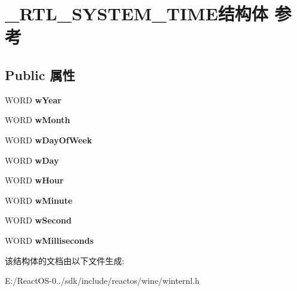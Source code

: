 \hypertarget{struct___r_t_l___s_y_s_t_e_m___t_i_m_e}{}\section{\+\_\+\+R\+T\+L\+\_\+\+S\+Y\+S\+T\+E\+M\+\_\+\+T\+I\+M\+E结构体 参考}
\label{struct___r_t_l___s_y_s_t_e_m___t_i_m_e}
\subsection*{Public 属性}
\begin{DoxyCompactItemize}
\item 
\mbox{\label{struct___r_t_l___s_y_s_t_e_m___t_i_m_e_ae08a48ff85ff5fea7b792f4677aeff7a}} 
W\+O\+RD {\bfseries w\+Year}
\item 
\mbox{\label{struct___r_t_l___s_y_s_t_e_m___t_i_m_e_a5ffe476c454b653fcf18899defc57175}} 
W\+O\+RD {\bfseries w\+Month}
\item 
\mbox{\label{struct___r_t_l___s_y_s_t_e_m___t_i_m_e_a2f8e70c2894d1dbba7d30637d827a37f}} 
W\+O\+RD {\bfseries w\+Day\+Of\+Week}
\item 
\mbox{\label{struct___r_t_l___s_y_s_t_e_m___t_i_m_e_ac0deebe06485f317aa85f1039cfd353b}} 
W\+O\+RD {\bfseries w\+Day}
\item 
\mbox{\label{struct___r_t_l___s_y_s_t_e_m___t_i_m_e_a9abb72f0d88bb5441f3e934a3132d30d}} 
W\+O\+RD {\bfseries w\+Hour}
\item 
\mbox{\label{struct___r_t_l___s_y_s_t_e_m___t_i_m_e_aeab68f90e56c3968c332e2cc4bf20bc2}} 
W\+O\+RD {\bfseries w\+Minute}
\item 
\mbox{\label{struct___r_t_l___s_y_s_t_e_m___t_i_m_e_a97988c5f2c71c9f4859d376614b8200b}} 
W\+O\+RD {\bfseries w\+Second}
\item 
\mbox{\label{struct___r_t_l___s_y_s_t_e_m___t_i_m_e_a5195b270e82bb267ffc38898fc0e67d9}} 
W\+O\+RD {\bfseries w\+Milliseconds}
\end{DoxyCompactItemize}


该结构体的文档由以下文件生成\+:\begin{DoxyCompactItemize}
\item 
E\+:/\+React\+O\+S-\/0../sdk/include/reactos/wine/winternl.\+h\end{DoxyCompactItemize}
